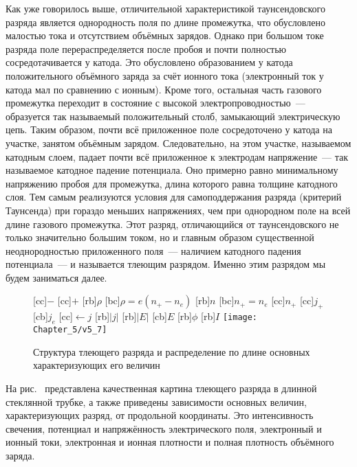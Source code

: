 Как уже говорилось выше, отличительной характеристикой таунсендовского разряда является однородность поля по длине
промежутка, что обусловлено малостью тока и отсутствием объёмных зарядов. Однако при большом токе разряда поле
перераспределяется после пробоя и почти полностью сосредотачивается у катода. Это обусловлено образованием у катода
положительного объёмного заряда за счёт ионного тока (электронный ток у катода мал по сравнению с ионным). Кроме того,
остальная часть газового промежутка переходит в состояние с высокой электропроводностью~--- образуется так называемый
положительный столб, замыкающий электрическую цепь. Таким образом, почти всё приложенное поле сосредоточено у катода на
участке, занятом объёмным зарядом. Следовательно, на этом участке, называемом катодным слоем, падает почти всё
приложенное к электродам напряжение~--- так называемое катодное падение потенциала. Оно примерно равно минимальному
напряжению пробоя для промежутка, длина которого равна толщине катодного слоя. Тем самым реализуются условия для
самоподдержания разряда (критерий Таунсенда) при гораздо меньших напряжениях, чем при однородном поле на всей длине
газового промежутка. Этот разряд, отличающийся от таунсендовского не только значительно большим током, но и главным
образом существенной неоднородностью приложенного поля~--- наличием катодного падения потенциала~--- и называется
тлеющим разрядом. Именно этим разрядом мы будем заниматься далее.

\begin{figure}[h!]
	\centering
	\psfrag{-}[cc]{$-$}
	\psfrag{+}[cc]{$+$}
	[rb]{$\rho$}
	[bc]{$\rho=e(n_+-n_e)$}
	[rb]{$n$}
	[bc]{$n_+=n_e$}
	[cc]{$n_+$}
	[cc]{$j_+$}
	[cb]{$j_e$}
	[cc]{$\leftarrow j$}
	[rb]{$|j|$}
	[rb]{$|E|$}
	[cb]{$E$}
	[rb]{$\phi$}
	[rb]{$I$}
	\texttt{[image: Chapter\_5/v5\_7]}
	\caption{Структура тлеющего разряда и распределение по длине основных характеризующих его величин}
\end{figure}

На рис.~ представлена качественная картина тлеющего разряда в длинной стеклянной трубке, а также приведены зависимости
основных величин, характеризующих разряд, от продольной координаты. Это интенсивность свечения, потенциал и
напряжённость электрического поля, электронный и ионный токи, электронная и ионная плотности и полная плотность
объёмного заряда.

